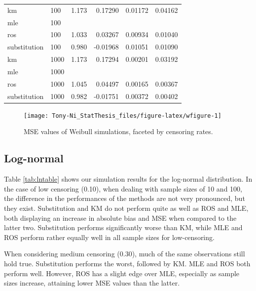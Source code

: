 \documentclass[12pt, twoside]{amherstthesis}
\begin{document}
\begin{table}
\begin{tabular}[t]{llrrrr}
\hline
\hspace{1em}km & 100 & 1.173 & 0.17290 & 0.01172 & 0.04162\\
\hspace{1em}mle & 100 &  &  &  & \\
\hspace{1em}ros & 100 & 1.033 & 0.03267 & 0.00934 & 0.01040\\
\hspace{1em}substitution & 100 & 0.980 & -0.01968 & 0.01051 & 0.01090\\
\hline
\hspace{1em}km & 1000 & 1.173 & 0.17294 & 0.00201 & 0.03192\\
\hspace{1em}mle & 1000 &  &  &  & \\
\hspace{1em}ros & 1000 & 1.045 & 0.04497 & 0.00165 & 0.00367\\
\hspace{1em}substitution & 1000 & 0.982 & -0.01751 & 0.00372 & 0.00402\\
\bottomrule
\end{tabular}
\end{table}
\begin{figure}

{\centering \texttt{[image: Tony-Ni\_StatThesis\_files/figure-latex/wfigure-1]} 

}

\caption{MSE values of Weibull simulations, faceted by censoring rates.}\label{fig:wfigure}
\end{figure}
\hypertarget{log-normalsimstudy}{%
\subsection{Log-normal}\label{log-normalsimstudy}}

Table \ref{tab:lntable} shows our simulation results for the log-normal distribution. In the case of low censoring (0.10), when dealing with sample sizes of 10 and 100, the difference in the performances of the methods are not very pronounced, but they exist. Substitution and KM do not perform quite as well as ROS and MLE, both displaying an increase in absolute bias and MSE when compared to the latter two. Substitution performs significantly worse than KM, while MLE and ROS perform rather equally well in all sample sizes for low-censoring.

When considering medium censoring (0.30), much of the same observations still hold true. Substitution performs the worst, followed by KM. MLE and ROS both perform well. However, ROS has a slight edge over MLE, especially as sample sizes increase, attaining lower MSE values than the latter.
\end{document}
